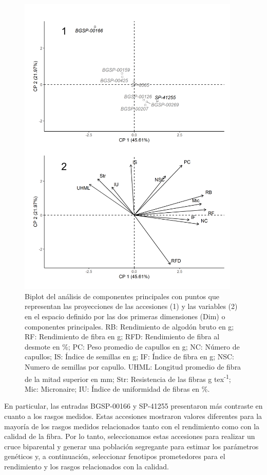 \documentclass[12pt,oneside]{reedthesis}
\begin{document}
\begin{figure}
\includegraphics[width=400px]{figure/chap1/Para_compuestas/PCA_juntas} \caption{Biplot del análisis de componentes principales con puntos que representan las proyecciones de las accesiones (1) y las variables (2) en el espacio definido por las dos primeras dimensiones (Dim) o componentes principales. RB: Rendimiento de algodón bruto en g; RF: Rendimiento de fibra en g; RFD: Rendimiento de fibra al desmote en \%; PC: Peso promedio de capullos en g; NC: Número de capullos; IS: Índice de semillas en g; IF: Índice de fibra en g; NSC: Numero de semillas por capullo. UHML: Longitud promedio de fibra de la mitad superior en mm; Str: Resistencia de las fibras g tex\textsuperscript{-1}; Mic: Micronaire; IU: Índice de uniformidad de fibras en \%.}\label{fig:img-PC}
\end{figure}

En particular, las entradas BGSP-00166 y SP-41255 presentaron más contraste en cuanto a los rasgos medidos. Estas accesiones mostraron valores diferentes para la mayoría de los rasgos medidos relacionados tanto con el rendimiento como con la calidad de la fibra. Por lo tanto, seleccionamos estas accesiones para realizar un cruce biparental y generar una población segregante para estimar los parámetros genéticos y, a continuación, seleccionar fenotipos prometedores para el rendimiento y los rasgos relacionados con la calidad.
\end{document}
